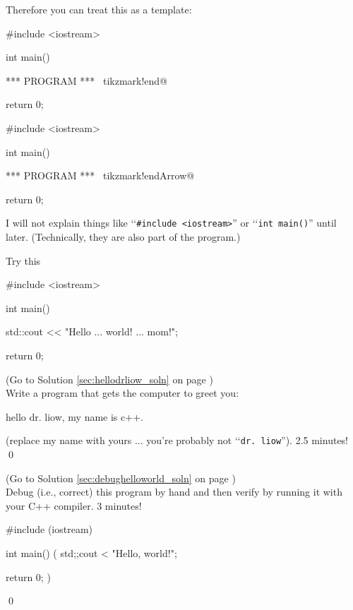 Therefore you can treat this as a template:


\begin{console}[commandchars=\~\!\@]
#include <iostream>

int main()
{

    *** PROGRAM *** ~tikzmark!end@

    return 0;
}
\end{console}
\begin{console}[commandchars=\~\!\@]
#include <iostream>

int main()
{

    *** PROGRAM *** ~tikzmark!endArrow@
    
    return 0;
}
\end{console}

I will not explain things like 
\lq\lq \verb!#include <iostream>!'' or 
\lq\lq\verb!int main()!'' until later. 
(Technically, they are also part of  the program.)



Try this
\begin{console}
#include <iostream>

int main()
{
    std::cout << "Hello ... world! ... mom!\n";

    return 0;
}
\end{console}

%

\begin{ex} 
\label{sec:hellodrliow}
(Go to Solution \ref{sec:hellodrliow_soln} 
on page \pageref{sec:hellodrliow_soln}) 
\\
Write a program that gets the computer to greet you:
\begin{console}
hello dr. liow, my name is c++.
\end{console}
(replace my name with yours ...  you're probably not 
\lq\lq\verb!dr. liow!'').
2.5 minutes!
\qed
\end{ex}


\begin{ex}
\label{sec:debughelloworld}
(Go to Solution \ref{sec:debughelloworld_soln} 
on page \pageref{sec:debughelloworld_soln}) 
\\
Debug (i.e., correct) this program by hand 
and then verify by running it 
with your C++ compiler.
3 minutes!
\begin{console}
#include (iostream)

int main()
(
    std;;cout < "Hello, world!\n";

    return 0;
)
\end{console}
\qed
\end{ex}



